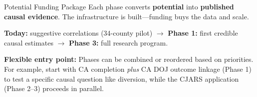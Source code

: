 \documentclass[aspectratio=169, 11pt]{beamer}
\begin{document}
\begin{frame}[t]{Potential Funding Package}
{\small Each phase converts \textbf{potential} into \textbf{published causal evidence}. The infrastructure is built---funding buys the data and scale.}
\vspace{4pt}
\vspace{4pt}

{\small \textbf{Today:} suggestive correlations (34-county pilot) $\to$ \textbf{Phase 1:} first credible causal estimates $\to$ \textbf{Phase 3:} full research program.}

{\small\textcolor{foundersrock}{\textbf{Flexible entry point:}} Phases can be combined or reordered based on priorities. For example, start with CA completion \emph{plus} CA DOJ outcome linkage (Phase 1) to test a specific causal question like diversion, while the CJARS application (Phase 2--3) proceeds in parallel.}
\end{frame}
\end{document}
